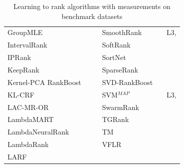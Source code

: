 \documentclass{sig-alternate}
\begin{document}
\begin{table}[!hp]
\begin{tabular}{lll|lll}
GroupMLE & \cite{Lin2010} & \cite{Lin2011} & SmoothRank & \cite{Chapelle2010} & L3, \cite{Chapelle2010} \\
IntervalRank & \cite{Moon2010} & \cite{Moon2010, Freno2011} & SoftRank & \cite{Taylor2008, Guiver2008} & \cite{Qin2010b} \\ 
IPRank & \cite{Wang2009b} & \cite{Wang2009b, Torkestani2012} & SortNet & \cite{Rigutini2008} & \cite{Rigutini2008,Freno2011} \\
KeepRank & \cite{Chen2009} & \cite{Chen2009} & SparseRank & \cite{Lai2013b} & \cite{Lai2013b} \\ 
Kernel-PCA RankBoost & \cite{Duh2008} & \cite{Duh2008, Sato2013} & SVD-RankBoost & \cite{Lin2009} & \cite{Lin2009} \\
KL-CRF & \cite{Volkovs2011} & \cite{Volkovs2011} & SVM$^{MAP}$ & \cite{Yue2007} & L3, \cite{Wang2012, Xu2008, Niu2012} \\ 
LAC-MR-OR & \cite{Veloso2008} & \cite{Veloso2008} & SwarmRank & \cite{Diaz-Aviles2009} & \cite{Sato2013} \\ 
LambdaMART & \cite{Burges2010} & \cite{Asadi2013a, Ganjisaffar2011c} & TGRank & \cite{Lai2013} & \cite{Lai2013} \\ 
LambdaNeuralRank & \cite{Papini2012} & \cite{Papini2012} & TM & \cite{Zhou2008} & \cite{Zhou2008, Papini2012, Tan2013} \\ 
LambdaRank & \cite{Burges2006} &  & VFLR & \cite{Cai2012} & \cite{Cai2012} \\ 
LARF & \cite{Torkestani2012} & \cite{Torkestani2012} &  &  &  \\
\bottomrule
\end{tabular}
\caption{Learning to rank algorithms with measurements on benchmark datasets}
\label{tab:ltr_methods_used}
\end{table}

\clearpage
\end{document}
